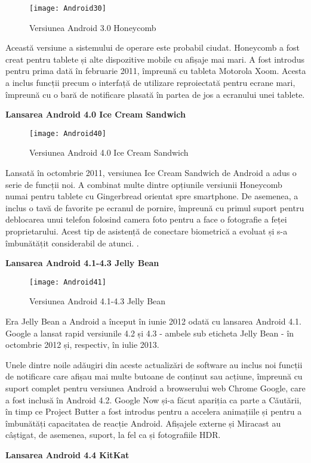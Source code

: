 \documentclass[a4paper]{article}
\begin{document}
\begin{figure}[h]
	\centering
	\texttt{[image: Android30]} \\
	\caption{Versiunea Android 3.0 Honeycomb}
	\label{fig:Android30}
\end{figure}
\par
Această versiune a sistemului de operare este probabil ciudat. Honeycomb a fost creat pentru tablete și alte dispozitive mobile cu afișaje mai mari. A fost introdus pentru prima dată în februarie 2011, împreună cu tableta Motorola Xoom. Acesta a inclus funcții precum o interfață de utilizare reproiectată pentru ecrane mari, împreună cu o bară de notificare plasată în partea de jos a ecranului unei tablete.
\begin{center}
	\large\textbf{Lansarea Android 4.0 Ice Cream Sandwich}
\end{center}

\begin{figure}[h]
	\centering
	\texttt{[image: Android40]} \\
	\caption{Versiunea Android 4.0 Ice Cream Sandwich}
	\label{fig:Android40}
\end{figure}
\par
Lansată în octombrie 2011, versiunea Ice Cream Sandwich de Android a adus o serie de funcții noi. A combinat multe dintre opțiunile versiunii Honeycomb numai pentru tablete cu Gingerbread orientat spre smartphone. De asemenea, a inclus o tavă de favorite pe ecranul de pornire, împreună cu primul suport pentru deblocarea unui telefon folosind camera foto pentru a face o fotografie a feței proprietarului. Acest tip de asistență de conectare biometrică a evoluat și s-a îmbunătățit considerabil de atunci.
.
\clearpage
\begin{center}
	\large\textbf{Lansarea Android 4.1-4.3 Jelly Bean}
\end{center}

\begin{figure}[h]
	\centering
	\texttt{[image: Android41]} \\
	\caption{Versiunea Android 4.1-4.3 Jelly Bean}
	\label{fig:Android41}
\end{figure}
\par
Era Jelly Bean a Android a început în iunie 2012 odată cu lansarea Android 4.1. Google a lansat rapid versiunile 4.2 și 4.3 - ambele sub eticheta Jelly Bean - în octombrie 2012 și, respectiv, în iulie 2013.
\par
Unele dintre noile adăugiri din aceste actualizări de software au inclus noi funcții de notificare care afișau mai multe butoane de conținut sau acțiune, împreună cu suport complet pentru versiunea Android a browserului web Chrome Google, care a fost inclusă în Android 4.2. Google Now și-a făcut apariția ca parte a Căutării, în timp ce Project Butter a fost introdus pentru a accelera animațiile și pentru a îmbunătăți capacitatea de reacție Android. Afișajele externe și Miracast au câștigat, de asemenea, suport, la fel ca și fotografiile HDR.
\begin{center}
	\large\textbf{Lansarea Android 4.4 KitKat}
\end{center}
\end{document}
